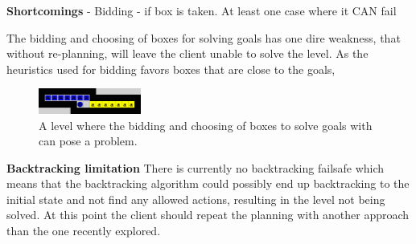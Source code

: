 \documentclass[Main]{subfiles}
\begin{document}
\textbf{Shortcomings}
- Bidding - if box is taken. At least one case where it CAN fail

The bidding and choosing of boxes for solving goals has one dire weakness, that without re-planning, will leave the client unable to solve the level. As the heuristics used for bidding favors boxes that are close to the goals,


\begin{figure}[h!]
    \centering
    \includegraphics[width=0.3\textwidth]{shortcomings.png}
    \caption{A level where the bidding and choosing of boxes to solve goals with can pose a problem.}
    \label{fig:shortcomings}
\end{figure}


\textbf{Backtracking limitation}
There is currently no backtracking failsafe which means that the backtracking algorithm could possibly end up backtracking to the initial state and not find any allowed actions, resulting in the level not being solved. 
At this point the client should repeat the planning with another approach than the one recently explored. 
\end{document}
